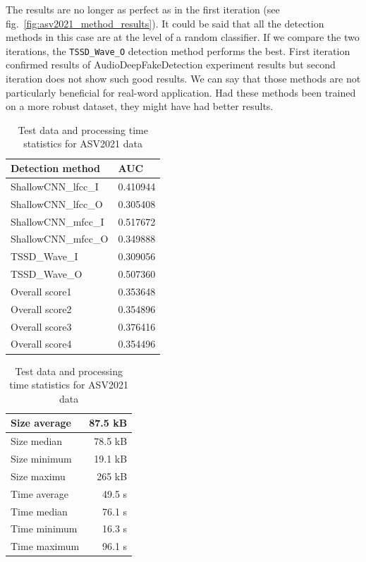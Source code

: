 The results are no longer as perfect as in the first iteration (see fig.~\ref{fig:asv2021_method_results}). It could be said that all the detection methods in this case are at the level of a random classifier. If we compare the two iterations, the \texttt{TSSD\_Wave\_O} detection method performs the best. First iteration confirmed results of AudioDeepFakeDetection experiment results but second iteration does not show such good results. We can say that those methods are not particularly beneficial for real-word application. Had these methods been trained on a more robust dataset, they might have had better results.

\begin{table}[H]
    \begin{minipage}[c]{.5\textwidth}
        \centering
        \begin{tabular}{|l|r|}
            \hline
            Detection method & \multicolumn{1}{l|}{AUC} \\ \hline
            ShallowCNN\_lfcc\_I & 0.410944 \\ \hline
            ShallowCNN\_lfcc\_O & 0.305408 \\ \hline
            ShallowCNN\_mfcc\_I & 0.517672 \\ \hline
            ShallowCNN\_mfcc\_O & 0.349888 \\ \hline
            TSSD\_Wave\_I & 0.309056 \\ \hline
            TSSD\_Wave\_O & 0.507360 \\ \hline
            Overall score1 & 0.353648 \\ \hline
            Overall score2 & 0.354896 \\ \hline
            Overall score3 & 0.376416 \\ \hline
            Overall score4 & 0.354496 \\ \hline
        \end{tabular}
        \caption{AUC values for ASV2021 data}
    \end{minipage}
    \begin{minipage}[c]{.5\textwidth}
        \centering
        \begin{tabular}{|l|r|}
            \hline
            Size average & 87.5 kB \\ \hline
            Size median & 78.5 kB \\ \hline
            Size minimum & 19.1 kB \\ \hline
            Size maximu & 265 kB \\ \hline
            Time average & 49.5 s \\ \hline
            Time median & 76.1 s \\ \hline
            Time minimum & 16.3 s \\ \hline
            Time maximum & 96.1 s \\ \hline
        \end{tabular}
        \caption{Test data and processing time statistics for ASV2021 data}
    \end{minipage}
\end{table}

